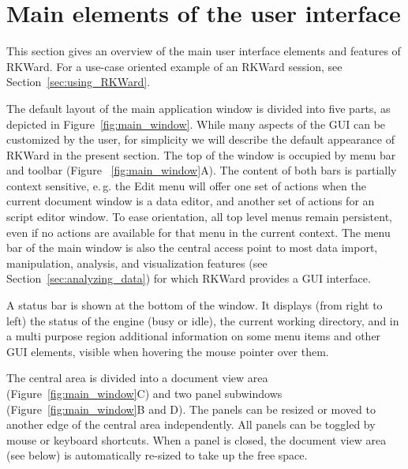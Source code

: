 \section{Main elements of the user interface}
\label{sec:user_interface}
This section gives an overview of the main user interface elements and features of RKWard.
For a use-case oriented example of an RKWard session, see Section~\ref{sec:using_RKWard}.

The default layout of the main application window is divided into five
parts, as depicted in Figure~\ref{fig:main_window}. While many aspects
of the GUI can be customized by the user, for simplicity we will
describe the default appearance of RKWard in the present section. The
top of the window is occupied by menu bar and toolbar (Figure~
\ref{fig:main_window}A). The content of both bars is partially context
sensitive, e.\,g. the Edit menu will offer
one set of actions when the current document window is a data editor,
and another set of actions for an  script
editor window. To ease orientation, all top level menus remain
persistent, even if no actions are available for that menu in the
current context. The menu bar of the main window is also the central
access point to most data import, manipulation, analysis, and
visualization features (see Section~\ref{sec:analyzing_data}) for which RKWard provides a GUI
interface.

A status bar is shown at the bottom of the window. It displays (from
right to left) the status of the  engine (busy or idle), the
current working directory, and in a multi purpose region additional
information on some menu items and other GUI elements, visible when
hovering the mouse pointer over them.

The central area is divided into a document view area
(Figure~\ref{fig:main_window}C) and two panel subwindows
(Figure~\ref{fig:main_window}B and D). The panels can be resized or moved to
another edge of the central area independently. All panels can be
toggled by mouse or keyboard shortcuts. When a panel is closed, the
document view area (see below) is automatically re-sized to take up the
free space.

